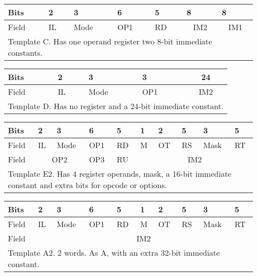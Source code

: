 \documentclass[forwardcom.tex]{subfiles}
\begin{document}
\begin{longtable}[l]{|p{7mm}|p{7mm}|p{7mm}|p{7mm}|p{7mm}|p{22mm}|p{22mm}|}
\endfirsthead
\label{table:templateC}
\endhead
\hline
 Bits & 2 & 3 & 6 & 5 & 
 \hspace{9mm} 8 & \hspace{9mm} 8 \\
\hline
Field & IL & Mode & OP1 & RD & 
\multicolumn{1}{|c|}{ IM2 } & \multicolumn{1}{|c|}{ IM1 } \\
\hline
\multicolumn{7}{|p{108mm}|}{
Template C. Has one operand register two 8-bit immediate constants.} \\
\hline
\end{longtable}

\begin{longtable}[l]{|p{7mm}|p{7mm}|p{7mm}|p{7mm}|p{52mm}|}
\endfirsthead
\label{table:templateD}
\endhead
\hline
 Bits & 2 & 3 & 3 & 
\multicolumn{1}{|c|}{ 24 } \\
\hline
Field & IL & Mode & OP1 & 
\multicolumn{1}{|c|}{ IM2 } \\
\hline
\multicolumn{5}{|p{108mm}|}{
Template D. Has no register and a 24-bit immediate constant.} \\
\hline
\end{longtable}

\begin{longtable}[l]{|p{7mm}|p{7mm}|p{7mm}|p{7mm}|p{7mm}|p{7mm}|p{7mm}|p{7mm}|p{7mm}|p{7mm}|}
\endfirsthead
\label{table:templateE2}
\endhead
\hline
 Bits & 2 & 3 & 6 & 5 & 1 & 2 & 5 & 3 & 5 \\
\hline
Field & IL & Mode & OP1 & RD & M & OT & RS & Mask & RT \\
\hline
Field & \multicolumn{2}{|c|}{ OP2 } & OP3 & RU & \multicolumn{5}{|c|}{ IM2 } \\
\hline
\multicolumn{10}{|p{108mm}|}{
Template E2. Has 4 register operands, mask, a 16-bit immediate constant and extra bits for
opcode or options.} \\
\hline
\end{longtable}

\begin{longtable}[l]{|p{7mm}|p{7mm}|p{7mm}|p{7mm}|p{7mm}|p{7mm}|p{7mm}|p{7mm}|p{7mm}|p{7mm}|}
\endfirsthead
\label{table:templateA2}
\endhead
\hline
 Bits & 2 & 3 & 6 & 5 & 1 & 2 & 5 & 3 & 5 \\
\hline
Field & IL & Mode & OP1 & RD & M & OT & RS & Mask & RT \\
\hline
Field & \multicolumn{9}{|c|}{ IM2 } \\
\hline
\multicolumn{10}{|l|}{
Template A2. 2 words. As A, with an extra 32-bit immediate constant.} \\
\hline
\end{longtable}
\end{document}
